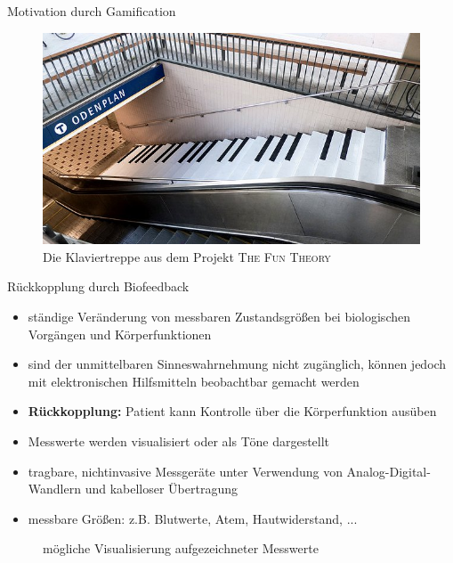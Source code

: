 \documentclass[final,20pt]{beamer}
\newlength{\colwidth}
\begin{document}
\begin{frame}[t]
\begin{columns}[t]
\begin{column}{\colwidth}
\begin{alertblock}{Motivation durch Gamification}
\begin{itemize}
  	\end{itemize}
  	\begin{figure}[H]
  		\centering
  		\includegraphics[width=0.5\colwidth]{pics/pianostairs}
  		\caption{Die Klaviertreppe aus dem Projekt \textsc{The Fun Theory}}
  		\label{fig:pianostairs}
  	\end{figure}
  \end{alertblock}

  \begin{alertblock}{Rückkopplung durch Biofeedback}
  	\begin{itemize}
  		\item ständige Veränderung von messbaren Zustandsgrößen bei biologischen Vorgängen und Körperfunktionen
  		\item sind der unmittelbaren Sinneswahrnehmung nicht zugänglich, können jedoch mit elektronischen Hilfsmitteln beobachtbar gemacht werden
  		\item \textbf{Rückkopplung:} Patient kann Kontrolle über die Körperfunktion ausüben
  		\item Messwerte werden visualisiert oder als Töne dargestellt
  		\item tragbare, nichtinvasive Messgeräte unter Verwendung von Analog-Digital-Wandlern und kabelloser Übertragung
  		\item messbare Größen: z.B. Blutwerte, Atem, Hautwiderstand, ...
  	\end{itemize}

    \begin{figure}
      \centering
      \caption{mögliche Visualisierung aufgezeichneter Messwerte}
    \end{figure}


\end{alertblock}
\end{column}
\end{columns}
\end{frame}
\end{document}
